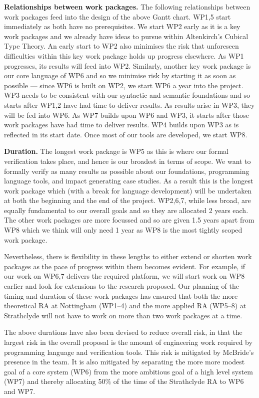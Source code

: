 \documentclass[a4paper,11pt]{article}
\begin{document}
\bigskip

{\bf Relationships between work packages.} The following 
relationships between work packages feed into the design of the above
Gantt chart. WP1,5 start immediately as both have no prerequisites. We
start WP2 early as it is a key work packages and we already have
ideas to pursue within Altenkirch's Cubical Type Theory. An early
start to WP2 also minimises the risk that unforeseen difficulties
within this key work package holds up progress elsewhere. As WP1
progresses, its results will feed into WP2. Similarly, another key
work package is our core language of WP6 and so we minimise risk by
starting it as soon as possible --- since WP6 is built on WP2, we
start WP6 a year into the project. WP3 needs to be consistent with our
syntactic and semantic foundations and so starts after WP1,2 have had
time to deliver results. As results arise in WP3, they will be fed
into WP6. As WP7 builds upon WP6 and WP3, it starts after those work
packages have had time to deliver results. WP4 builds upon WP3 as is
reflected in its start date. Once most of our tools are
developed, we start WP8.

{\bf Duration.} The longest work package is WP5 as this is where our
formal verification takes place, and hence is our broadest in terms of
scope. We want to formally verify as many results as possible about
our foundations, programming language tools, and impact generating
case studies.  As a result this is the longest work package which
(with a break for language development) will be undertaken at both the
beginning and the end of the project. WP2,6,7, while less broad, are
equally fundamental to our overall goals and so they are allocated 2
years each. The other work packages are more focussed and
so are given 1.5 years apart from WP8 which we think will only need 1
year as WP8 is the most tightly scoped work package.

Nevertheless, there is flexibility in these lengths to either extend
or shorten work packages as the pace of progress within them becomes
evident. For example, if our work on WP6,7 delivers the required
platform, we will start work on WP8 earlier and look for extensions to
the research proposed. Our planning of the timing and duration of
these work packages has ensured that both the more theoretical RA at
Nottingham (WP1--4) and the more applied RA (WP5--8) at Strathclyde
will not have to work on more than two work packages at a time.

The above durations have also been devised to reduce overall risk, in
that the largest risk in the overall proposal is the amount of
engineering work required by programming language and verification
tools. This risk is mitigated by McBride's presence in the
team. It is also mitigated by separating the more more modest goal of
a core system (WP6) from the more ambitious goal of a high level system
(WP7) and thereby allocating 50$\%$ of the time of the Strathclyde RA to WP6 and
WP7. 
\end{document}

